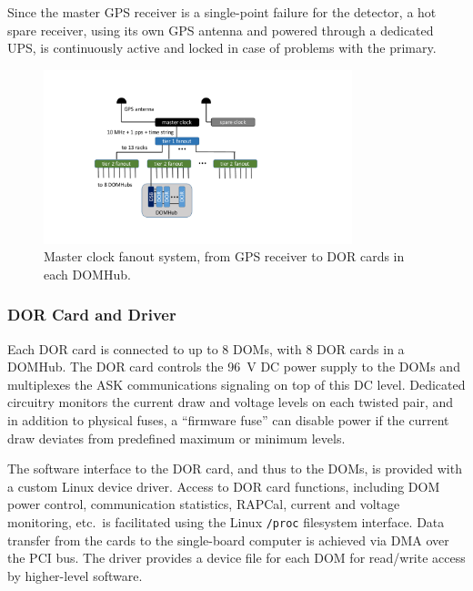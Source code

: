 Since the master GPS receiver is a single-point failure for the detector, a
hot spare receiver, using its own GPS antenna and powered through a
dedicated UPS, is continuously active and locked in case of problems with
the primary.

\begin{figure}[!ht]
 \centering
 \includegraphics[width=0.8\textwidth]{graphics/online/data_readout/clock_fanout.pdf}
 \caption{Master clock fanout system, from GPS receiver to DOR cards in
   each DOMHub.}
 \label{fig:clock_fanout}
\end{figure}


\subsubsection{DOR Card and Driver}

Each DOR card is connected to up to 8 DOMs, with 8 DOR cards in a
DOMHub. The DOR card controls the 96~V DC power supply to the DOMs and
multiplexes the ASK communications signaling on top of this DC level.
Dedicated circuitry monitors the current draw and voltage levels on each
twisted pair, and in addition to physical fuses, a ``firmware fuse'' can
disable power if the current draw deviates from predefined maximum or
minimum levels.

The software interface to the DOR card, and thus to the DOMs, is provided
with a custom Linux device driver.  Access to DOR card functions, including
DOM power control, communication statistics, RAPCal, current and voltage
monitoring, etc.~is facilitated using the Linux \texttt{/proc} filesystem
interface.  Data transfer from the cards to the single-board computer is
achieved via DMA over the PCI bus.  The driver provides a device file for
each DOM for read/write access by higher-level software.

